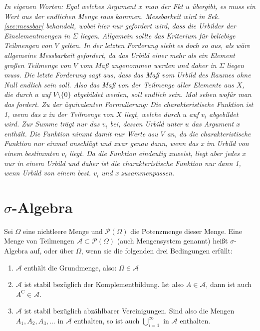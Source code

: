 \documentclass[paper=a4,10pt]{scrartcl}
\begin{document}
\noindent
\textit{In eigenen Worten: Egal welches Argument $x$ man der Fkt $u$ übergibt, es muss ein Wert aus der endlichen Menge raus kommen. Messbarkeit wird in Sek. \ref{sec:messbar} behandelt, wobei hier nur gefordert wird, dass die Urbilder der Einelementmengen in $\Sigma$ liegen. Allgemein sollte das Kriterium für beliebige Teilmengen von $V$ gelten. In der letzten Forderung sieht es doch so aus, als wäre allgemeine Messbarkeit gefordert, da das Urbild einer mehr als ein Element großen Teilmenge von $V$ vom Maß angenommen werden und daher in $\Sigma$ liegen muss. Die letzte Forderung sagt aus, dass das Maß vom Urbild des Raumes ohne Null endlich sein soll. Also das Maß von der Teilmenge aller Elemente aus $X$, die durch $u$ auf $V \setminus \{ 0\}$ abgebildet werden, soll endlich sein. Mal sehen wofür man das fordert. Zu der äquivalenten Formulierung: Die charakteristische Funktion ist 1, wenn das x in der Teilmenge von $X$ liegt, welche durch $u$ auf $v_i$ abgebildet wird. Zur Summe trägt nur das $v_i$ bei, dessen Urbild unter $u$ das Argument $x$ enthält. Die Funktion nimmt damit nur Werte asu $V$ an, da die charakteristische Funktion nur einmal anschlägt und zwar genau dann, wenn das x im Urbild von einem bestimmten $v_i$ liegt. Da die Funktion eindeutig zuweist, liegt aber jedes x nur in einem Urbild und daher ist die charakteristische Funktion nur dann 1, wenn Urbild von einem best. $v_i$ und x zusammenpassen.}



\section{$\sigma$-Algebra}
Sei $\Omega$ eine nichtleere Menge und $\mathcal{P}(\Omega)$ die Potenzmenge dieser Menge. Eine Menge von Teilmengen $\mathcal{A} \subset \mathcal{P}(\Omega)$ (auch Mengensystem genannt) heißt $\sigma$-Algebra auf, oder über $\Omega$, wenn sie die folgenden drei Bedingungen erfüllt:

\begin{enumerate}
	\item $\mathcal{A}$ enthält die Grundmenge, also: $\Omega \in \mathcal{A}$
	\item $\mathcal{A}$ ist stabil bezüglich der Komplementbildung. Ist also $A \in \mathcal{A}$, dann ist auch $A^{\mathrm{C}} \in \mathcal{A}$.
	\item $\mathcal{A}$ ist stabil bezüglich abzählbarer Vereinigungen. Sind also die Mengen $A_1, A_2, A_3, \dots$ in $\mathcal{A}$ enthalten, so ist auch $\bigcup^\infty_{i=1}$ in $\mathcal{A}$ enthalten.
\end{enumerate}
\end{document}
